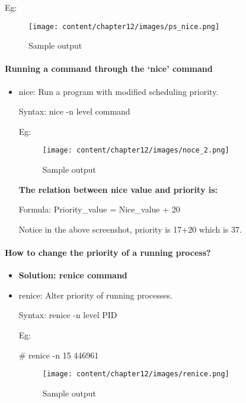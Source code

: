 \begin{flushleft}
\begin{itemize}
	Eg:
	\begin{figure}[h!]
		\centering
		\texttt{[image: content/chapter12/images/ps\_nice.png]}
		\caption{Sample output}
		\label{fig:cpu589}
	\end{figure}
	\newpage

\end{itemize}



\paragraph{Running a command through the ‘nice’ command}
\begin{itemize}
	\item nice: Run a program with modified scheduling priority.
	\bigskip
	\begin{tcolorbox}[breakable,notitle,boxrule=-0pt,colback=pink,colframe=pink]
		\color{black}
		\font=9pt
		Syntax: nice -n level command
		\font=4pt
	\end{tcolorbox}	
	 Eg:
 	\begin{figure}[h!]
	 	\centering
	 	\texttt{[image: content/chapter12/images/noce\_2.png]}
	 	\caption{Sample output}
	 	\label{fig:cpu5893}
	 \end{figure}
	 
	 \textbf{The relation between nice value and priority is:}
	 \bigskip
	 \begin{tcolorbox}[breakable,notitle,boxrule=-0pt,colback=pink,colframe=pink]
	 	\color{black}
	 	\font=9pt
	 	Formula: Priority\_value = Nice\_value + 20
	 	\font=4pt
	 \end{tcolorbox}	 
 	Notice in the above screenshot, priority is 17+20 which is 37.
\end{itemize}

\newpage
\paragraph{How to change the priority of a running process?}
\begin{itemize}
	\item \textbf{Solution: renice command}
	\item renice: Alter priority of running processes.
	\bigskip
	\begin{tcolorbox}[breakable,notitle,boxrule=-0pt,colback=pink,colframe=pink]
		\color{black}
		\font=9pt
		Syntax: renice -n level PID
		\font=4pt
	\end{tcolorbox}	
	Eg:
	\bigskip
	\begin{tcolorbox}[breakable,notitle,boxrule=-0pt,colback=black,colframe=black]
		\color{green}
		\font=9pt
		\# renice -n 15 446961
		\font=4pt
	\end{tcolorbox}
	\bigskip
	\begin{figure}[h!]
		\centering
		\texttt{[image: content/chapter12/images/renice.png]}
		\caption{Sample output}
		\label{fig:cpu58934}
	\end{figure}
	

\end{itemize}
\end{flushleft}
